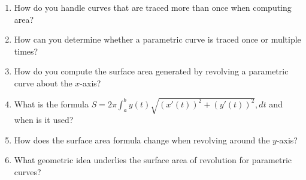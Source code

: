 \begin{enumerate}
  \item How do you handle curves that are traced more than once when computing area?
  \item How can you determine whether a parametric curve is traced once or multiple times?
  \item How do you compute the surface area generated by revolving a parametric curve about the \(x\)-axis?
  \item What is the formula \(S = 2\pi \int_{a}^{b} y(t)\sqrt{(x'(t))^{2} + (y'(t))^{2}},dt\) and when is it used?
  \item How does the surface area formula change when revolving around the \(y\)-axis?
  \item What geometric idea underlies the surface area of revolution for parametric curves?
\end{enumerate}
